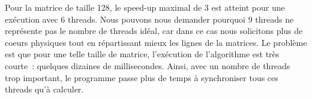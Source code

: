 Pour la matrice de taille 128, le speed-up maximal de 3 est atteint
pour une exécution avec 6 threads. Nous pouvons nous demander pourquoi
9 threads ne représente pas le nombre de threads idéal, car dans ce
cas nous solicitons plus de coeurs physiques tout en répartissant
mieux les lignes de la matrices. Le problème est que pour une telle
taille de matrice, l'exécution de l'algorithme est très courte~:
quelques dizaines de millisecondes. Ainsi, avec un nombre de threads
trop important, le programme passe plus de temps à synchroniser tous
ces threads qu'à calculer.
\medskip

\begin{figure}[!ht]
  \caption{}
  \label{fig:homopar128}
\end{figure}

\begin{figure}[!ht]
  \caption{}
  \label{fig:homopar512}
\end{figure}

\begin{figure}[!ht]
  \caption{}
  \label{fig:tourpar128}
\end{figure}

